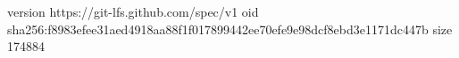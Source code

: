 version https://git-lfs.github.com/spec/v1
oid sha256:f8983efee31aed4918aa88f1f017899442ee70efe9e98dcf8ebd3e1171dc447b
size 174884
